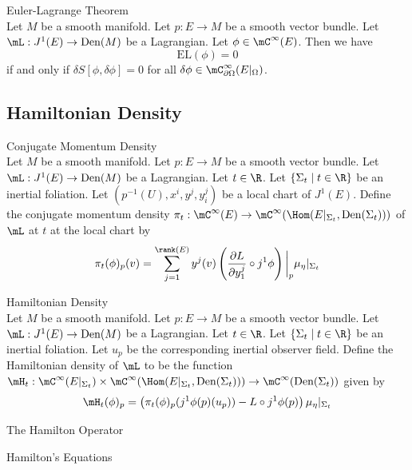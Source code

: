 \documentclass[a4paper]{article}
\begin{document}
\begin{thm}{Euler-Lagrange Theorem}{}\\
Let $M$ be a smooth manifold. Let $p:E\to M$ be a smooth vector bundle. Let $\mL:J^1(E)\to\text{Den}(M)$ be a Lagrangian. Let $\phi\in\mC^\infty(E)$. Then we have $$\text{EL}(\phi)=0$$ if and only if $\delta S[\phi,\delta\phi]=0$ for all $\delta\phi\in\mC_{\partial\Omega}^\infty(E|_\Omega)$. 
\end{thm}

\subsection{Hamiltonian Density}
\begin{defn}{Conjugate Momentum Density}{}\\
Let $M$ be a smooth manifold. Let $p:E\to M$ be a smooth vector bundle. Let $\mL:J^1(E)\to\text{Den}(M)$ be a Lagrangian. Let $t\in\R$. Let $\{\Sigma_t\;|\;t\in\R\}$ be an inertial foliation. Let $(p^{-1}(U),x^i,y^j,y_i^j)$ be a local chart of $J^1(E)$. Define the conjugate momentum density $\pi_t:\mC^\infty(E)\to\mC^\infty(\Hom(E|_{\Sigma_t},\text{Den}(\Sigma_t)))$ of $\mL$ at $t$ at the local chart by $$\pi_t(\phi)_p(v)=\sum_{j=1}^{\rank(E)}y^j(v)\left(\frac{\partial L}{\partial y_1^j}\circ j^1\phi\right)\bigg{|}_p\mu_\eta|_{\Sigma_t}$$
\end{defn}

\begin{defn}{Hamiltonian Density}{}\\
Let $M$ be a smooth manifold. Let $p:E\to M$ be a smooth vector bundle. Let $\mL:J^1(E)\to\text{Den}(M)$ be a Lagrangian. Let $t\in\R$. Let $\{\Sigma_t\;|\;t\in\R\}$ be an inertial foliation. Let $u_p$ be the corresponding inertial observer field. Define the Hamiltonian density of $\mL$ to be the function $\mH_t:\mC^\infty(E|_{\Sigma_t})\times\mC^\infty(\Hom(E|_{\Sigma_t},\text{Den}(\Sigma_t)))\to\mC^\infty(\text{Den}(\Sigma_t))$ given by $$\mH_t(\phi)_p=\left(\pi_t(\phi)_p(j^1\phi(p)(u_p))-L\circ j^1\phi(p)\right)\mu_\eta|_{\Sigma_t}$$
\end{defn}

\begin{defn}{The Hamilton Operator}{}
\end{defn}

\begin{thm}{Hamilton's Equations}{}\\

\end{thm}
\end{document}
